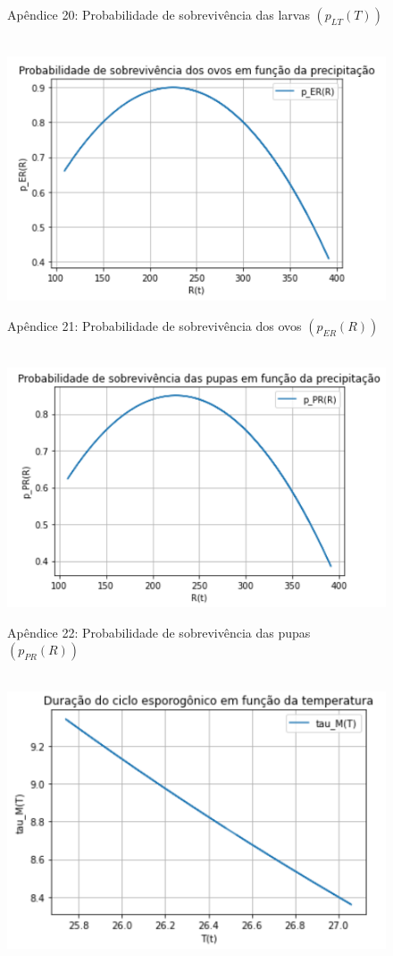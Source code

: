 \documentclass[
	12pt,				%
	oneside,			%
	a4paper,			%
	english,			%
	brazil				%
	]{abntex2}
\begin{document}
\begin{apendicesenv}
\begin{figure}[!ht]
	\caption*{Apêndice 20: Probabilidade de sobrevivência das larvas $(p_{LT}(T))$} 
\end{figure} 
\newpage
\begin{figure}[!ht]
	\centering
	\hbox{\hspace{3.0em} \includegraphics[scale=1.0] {Plot_p_ER(R).png}}
	\caption*{Apêndice 21: Probabilidade de sobrevivência dos ovos $(p_{ER}(R))$} 
\end{figure} 
\begin{figure}[!ht]
	\centering
	\hbox{\hspace{2.5em} \includegraphics[scale=1.0] {Plot_p_PR(R).png}}
	\caption*{Apêndice 22: Probabilidade de sobrevivência das pupas $(p_{PR}(R))$} 
\end{figure} 
\newpage
\begin{figure}[!ht]
	\centering
	\hbox{\hspace{3.0em} \includegraphics[scale=1.0] {Plot_tau_M(T).png}}

\end{figure}
\end{apendicesenv}
\end{document}
